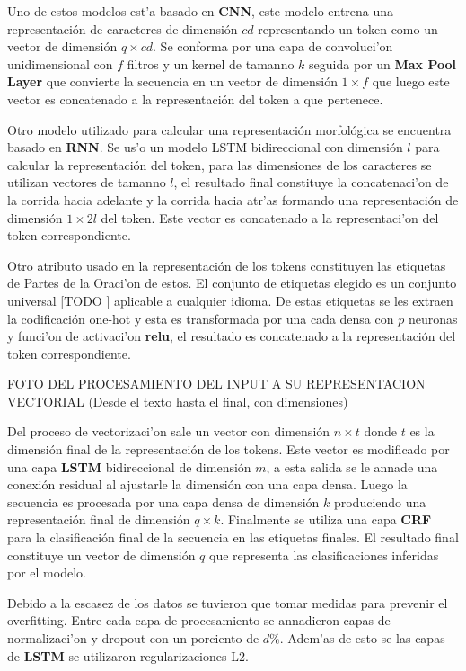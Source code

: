 Uno de estos modelos est'a basado en \textbf{CNN}, este modelo entrena una representación de caracteres de dimensión
$cd$ representando un token como un vector de dimensión $q \times cd$. Se conforma por una capa de convoluci'on unidimensional
con $f$ filtros y un kernel de tamanno $k$ seguida por un \textbf{Max Pool Layer} que convierte la secuencia en un vector
de dimensión $1 \times f$ que luego este vector es concatenado a la representación del token a que pertenece.

Otro modelo utilizado para calcular una representación morfológica se encuentra basado en \textbf{RNN}. Se us'o
un modelo LSTM bidireccional con dimensión $l$ para calcular la representación del token, para las dimensiones de los caracteres se
utilizan vectores de tamanno $l$, el resultado final constituye la concatenaci'on de la corrida hacia adelante y la corrida
hacia atr'as formando una representación de dimensión $1 \times 2l$ del token. Este vector es concatenado a la representaci'on
del token correspondiente.

Otro atributo usado en la representación de los tokens constituyen las etiquetas de Partes de la Oraci'on de estos.
El conjunto de etiquetas elegido es un conjunto universal [TODO \cite{Referencia a la def}] aplicable a cualquier idioma.
De estas etiquetas se les extraen la codificación one-hot y esta es transformada por una cada densa con $p$ neuronas
y funci'on de activaci'on \textbf{relu}, el resultado es concatenado a la representación del token correspondiente.

FOTO DEL PROCESAMIENTO DEL INPUT A SU REPRESENTACION VECTORIAL (Desde el texto hasta el final, con dimensiones) 

Del proceso de vectorizaci'on sale un vector con dimensión $n \times t$ donde $t$ es la dimensión final de la representación
de los tokens. Este vector es modificado por una capa \textbf{LSTM} bidireccional de dimensión $m$, a esta salida se le 
annade una conexión residual al ajustarle la dimensión con una capa densa. Luego la secuencia es procesada por una 
capa densa de dimensión $k$ produciendo una representación final de dimensión $q \times k$.
Finalmente se utiliza una capa \textbf{CRF}
para la clasificación final de la secuencia en las etiquetas finales. El resultado final constituye un vector
de dimensión $q$ que representa las clasificaciones inferidas por el modelo.

Debido a la escasez de los datos se tuvieron que tomar medidas para prevenir el overfitting. Entre cada capa de 
procesamiento se annadieron capas de normalizaci'on y dropout con un porciento de $d$\%. Adem'as de esto se 
las capas de \textbf{LSTM} se utilizaron regularizaciones L2.

